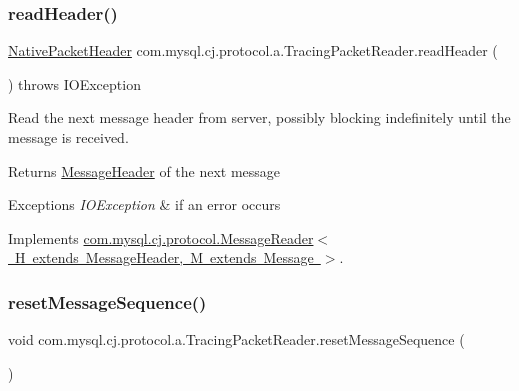 \subsubsection{\texorpdfstring{read\+Header()}{readHeader()}}
{\footnotesize\ttfamily \mbox{\hyperlink{classcom_1_1mysql_1_1cj_1_1protocol_1_1a_1_1_native_packet_header}{Native\+Packet\+Header}} com.\+mysql.\+cj.\+protocol.\+a.\+Tracing\+Packet\+Reader.\+read\+Header (\begin{DoxyParamCaption}{ }\end{DoxyParamCaption}) throws I\+O\+Exception}

Read the next message header from server, possibly blocking indefinitely until the message is received.

\begin{DoxyReturn}{Returns}
\mbox{\hyperlink{interfacecom_1_1mysql_1_1cj_1_1protocol_1_1_message_header}{Message\+Header}} of the next message 
\end{DoxyReturn}

\begin{DoxyExceptions}{Exceptions}
{\em I\+O\+Exception} & if an error occurs \\
\hline
\end{DoxyExceptions}


Implements \mbox{\hyperlink{interfacecom_1_1mysql_1_1cj_1_1protocol_1_1_message_reader_a09745b0e30f74fa13e2b32f22ce70cbb}{com.\+mysql.\+cj.\+protocol.\+Message\+Reader$<$ H extends Message\+Header, M extends Message $>$}}.

\mbox{\label{classcom_1_1mysql_1_1cj_1_1protocol_1_1a_1_1_tracing_packet_reader_a750a22688863ef18d02baaccd7f8475d}} 
\subsubsection{\texorpdfstring{reset\+Message\+Sequence()}{resetMessageSequence()}}
{\footnotesize\ttfamily void com.\+mysql.\+cj.\+protocol.\+a.\+Tracing\+Packet\+Reader.\+reset\+Message\+Sequence (\begin{DoxyParamCaption}{ }\end{DoxyParamCaption})}

